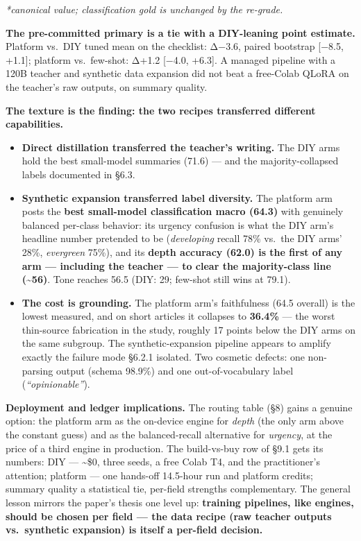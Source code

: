 \documentclass[11pt]{article}
\providecommand{\tightlist}{\setlength{\itemsep}{0pt}\setlength{\parskip}{0pt}}
\providecommand{\tightlist}{%
  \setlength{\itemsep}{0pt}\setlength{\parskip}{0pt}}
\begin{document}
\emph{*canonical value; classification gold is unchanged by the
re-grade.}

\textbf{The pre-committed primary is a tie with a DIY-leaning point
estimate.} Platform vs.~DIY tuned mean on the checklist: Δ−3.6, paired
bootstrap {[}−8.5, +1.1{]}; platform vs.~few-shot: Δ+1.2 {[}−4.0,
+6.3{]}. A managed pipeline with a 120B teacher and synthetic data
expansion did not beat a free-Colab QLoRA on the teacher's raw outputs,
on summary quality.

\textbf{The texture is the finding: the two recipes transferred
different capabilities.}

\begin{itemize}
\tightlist
\item
  \textbf{Direct distillation transferred the teacher's writing.} The
  DIY arms hold the best small-model summaries (71.6) --- and the
  majority-collapsed labels documented in §6.3.
\item
  \textbf{Synthetic expansion transferred label diversity.} The platform
  arm posts the \textbf{best small-model classification macro (64.3)}
  with genuinely balanced per-class behavior: its urgency confusion is
  what the DIY arm's headline number pretended to be (\emph{developing}
  recall 78\% vs.~the DIY arms' 28\%, \emph{evergreen} 75\%), and its
  \textbf{depth accuracy (62.0) is the first of any arm --- including
  the teacher --- to clear the majority-class line (\textasciitilde56)}.
  Tone reaches 56.5 (DIY: 29; few-shot still wins at 79.1).
\item
  \textbf{The cost is grounding.} The platform arm's faithfulness (64.5
  overall) is the lowest measured, and on short articles it collapses to
  \textbf{36.4\%} --- the worst thin-source fabrication in the study,
  roughly 17 points below the DIY arms on the same subgroup. The
  synthetic-expansion pipeline appears to amplify exactly the failure
  mode §6.2.1 isolated. Two cosmetic defects: one non-parsing output
  (schema 98.9\%) and one out-of-vocabulary label
  (\emph{``opinionable''}).
\end{itemize}

\textbf{Deployment and ledger implications.} The routing table (§8)
gains a genuine option: the platform arm as the on-device engine for
\emph{depth} (the only arm above the constant guess) and as the
balanced-recall alternative for \emph{urgency}, at the price of a third
engine in production. The build-vs-buy row of §9.1 gets its numbers: DIY
--- \textasciitilde\$0, three seeds, a free Colab T4, and the
practitioner's attention; platform --- one hands-off 14.5-hour run and
platform credits; summary quality a statistical tie, per-field strengths
complementary. The general lesson mirrors the paper's thesis one level
up: \textbf{training pipelines, like engines, should be chosen per field
--- the data recipe (raw teacher outputs vs.~synthetic expansion) is
itself a per-field decision.}
\end{document}
